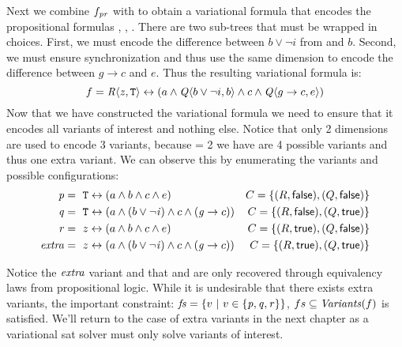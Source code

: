 Next we combine $f_{\mathit{p}\mathit{r}}$ with \qV{} to obtain a variational formula that encodes the
propositional formulas \pV{}, \qV{}, \rV{}. There are two sub-trees that must be
wrapped in choices. First, we must encode the difference between $b \vee \neg i$
from \qV{} and $b$. Second, we must ensure synchronization and thus use the same
dimension to encode the difference between $g \rightarrow c$ and $e$. Thus the
resulting variational formula is:
%
\begin{equation*}
  f = \chc[\dimR]{\zV, \tru{}} \leftrightarrow (a \wedge \chc[\dimQ]{b \vee \neg i, b} \wedge c \wedge \chc[\dimQ]{g \rightarrow c, e})
\end{equation*}
%
Now that we have constructed the variational formula we need to ensure that it
encodes all variants of interest and nothing else. Notice that only 2 dimensions
are used to encode 3 variants, because  = 2 we have are 4
possible variants and thus one extra variant. We can observe this by enumerating
the variants and possible configurations:
%
\begin{align*}
  \pV &=\ \tru{} \leftrightarrow (a \wedge b \wedge c \wedge e)                          & C = \{(\dimR, \false), (\dimQ, \false)\} \\
  \qV &=\ \tru{} \leftrightarrow (a \wedge (b \vee \neg \iV{}) \wedge c \wedge (\gV{} \rightarrow c))   & C = \{(\dimR, \false), (\dimQ, \true)\} \\
  \rV &=~z \leftrightarrow (a \wedge b \wedge c \wedge e)                               & C = \{(\dimR, \true), (\dimQ, \false)\} \\
  \kf{extra} &=~z \leftrightarrow (a \wedge (b \vee \neg \iV{}) \wedge c \wedge (\gV{} \rightarrow c)) & C = \{(\dimR, \true), (\dimQ, \true)\}
\end{align*}
%

Notice the $\mathit{extra}$ variant and that \pV{} and \qV{} are only recovered
through equivalency laws from propositional logic. While it is undesirable that
there exists extra variants, the important constraint: $\mathit{fs} = \{ v\ |\ v \in
\{ \mathit{p}, \mathit{q}, \mathit{r}\} \}$, $fs \subseteq \mathit{Variants}(f)$ is satisfied. We'll return
to the case of extra variants in the next chapter as a
variational \ac{sat} solver must only solve variants of interest.



